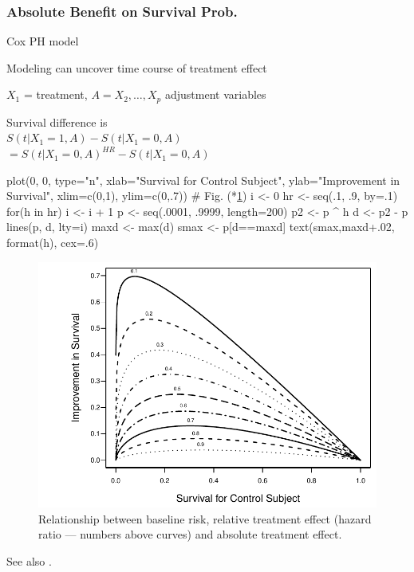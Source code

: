 \subsubsection{Absolute Benefit on Survival Prob.}
\bi
\item   Cox PH model
\item   Modeling can uncover time course of treatment effect
\item   $X_1$ = treatment, $A={X_{2},\ldots,X_{p}}$ adjustment
        variables
\item   Survival difference is \\ $S(t | X_{1}=1, A) - S(t | X_{1}=0, A)$
\\ $ = S(t | X_{1}=0, A)^{HR} - S(t | X_{1}=0, A)$
\begin{Schunk}
\begin{Sinput}
plot(0, 0, type="n", xlab="Survival for Control Subject",
     ylab="Improvement in Survival",
     xlim=c(0,1), ylim=c(0,.7))     # Fig. (*\ref{fig:ancova-hr-vs-surv}\ipacue*)
i <- 0
hr <- seq(.1, .9, by=.1)
for(h in hr) {
  i <- i + 1
  p <- seq(.0001, .9999, length=200)
  p2 <- p ^ h
  d <- p2 - p
  lines(p, d, lty=i)
  maxd <- max(d)
  smax <- p[d==maxd]
  text(smax,maxd+.02, format(h), cex=.6)
}
\end{Sinput}
\begin{figure}[htbp]

\centerline{\includegraphics{ancova-hr-vs-surv-1} }

\caption[Baseline risk, hazard ratio, and absolute effect]{Relationship between baseline risk, relative treatment effect (hazard ratio --- numbers above curves) and absolute treatment effect.}\label{fig:ancova-hr-vs-surv}
\end{figure}
\end{Schunk}
\item See also \cite{ken07lim}.
\ei

